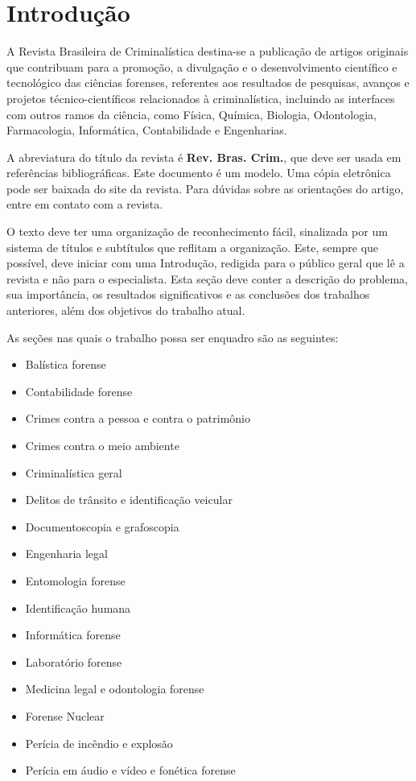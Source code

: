 \documentclass{RBClatex}
\begin{document}
\section{Introdução}

A Revista Brasileira de Criminalística destina-se a publicação de artigos originais que contribuam para a promoção, a divulgação e o desenvolvimento científico e tecnológico das ciências forenses, referentes aos resultados de pesquisas, avanços e projetos técnico-científicos relacionados à criminalística, incluindo as interfaces com outros ramos da ciência, como Física, Química, Biologia, Odontologia, Farmacologia, Informática, Contabilidade e Engenharias.

A abreviatura do título da revista é \textbf{Rev. Bras. Crim.}, que deve ser usada em referências bibliográficas.
Este documento é um modelo. Uma cópia eletrônica pode ser baixada do site da revista. Para dúvidas sobre as orientações do artigo, entre em contato com a revista.

O texto deve ter uma organização de reconhecimento fácil, sinalizada por um sistema de títulos e subtítulos que reflitam a organização. Este, sempre que possível, deve iniciar com uma Introdução, redigida para o público geral que lê a revista e não para o especialista. Esta seção deve conter a descrição do problema, sua importância, os resultados significativos e as conclusões dos trabalhos anteriores, além dos objetivos do trabalho atual.

As seções nas quais o trabalho possa ser enquadro são as seguintes: 
\begin{itemize}[noitemsep,topsep=0pt,leftmargin=*,labelindent=7.5mm,labelsep=2mm]
	\item Balística forense
	\item Contabilidade forense
	\item Crimes contra a pessoa e contra o patrimônio
	\item Crimes contra o meio ambiente
	\item Criminalística geral
	\item Delitos de trânsito e identificação veicular
	\item Documentoscopia e grafoscopia
	\item Engenharia legal
	\item Entomologia forense
	\item Identificação humana
	\item Informática forense
	\item Laboratório forense
	\item Medicina legal e odontologia forense
	\item Forense Nuclear
	\item Perícia de incêndio e explosão
	\item Perícia em áudio e vídeo e fonética forense 
\end{itemize}
\end{document}

